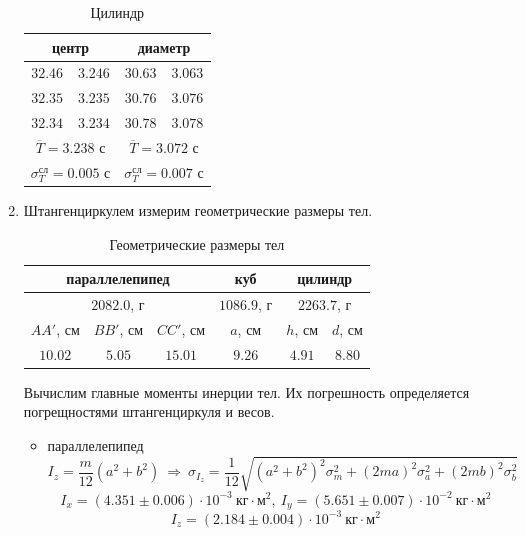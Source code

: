 \documentclass[a4paper,12pt]{article}
\begin{document}
\begin{enumerate}
    \begin{table}[!h]
        \centering
        \begin{tabular}{|c|c|c|c|} \hline
            \multicolumn{2}{|c}{центр} & \multicolumn{2}{|c}{диаметр} \\ \hline
            $32.46$ & $3.246$ & $30.63$ & $3.063$ \\ \hline
            $32.35$ & $3.235$ & $30.76$ & $3.076$ \\ \hline
            $32.34$ & $3.234$ & $30.78$ & $3.078$ \\ \hline
            \multicolumn{2}{|c|}{$\overline{T} = 3.238$ с} & \multicolumn{2}{|c|}{$\overline{T} = 3.072$ с} \\ 
            \multicolumn{2}{|c|}{$\sigma_T^{\text{сл}} = 0.005$ с} & \multicolumn{2}{|c|}{$\sigma_T^{\text{сл}} = 0.007$ с} \\ \hline
        \end{tabular}
        \caption{Цилиндр}
    \end{table}
    \item Штангенциркулем измерим геометрические размеры тел.
    \begin{table}[!h]
        \centering
        \begin{tabular}{|c|c|c|c|c|c|} \hline
            \multicolumn{3}{|c|}{параллелепипед} & куб & \multicolumn{2}{|c|}{цилиндр} \\ \hline
            \multicolumn{3}{|c|}{$2082.0$, г} & $1086.9$, г & \multicolumn{2}{|c|}{$2263.7$, г} \\ \hline
            $AA'$, см & $BB'$, см & $CC'$, см & $a$, см & $h$, см & $d$, см \\ \hline
            $10.02$ & $5.05$ & $15.01$ & $9.26$ & $4.91$ & $8.80$ \\ \hline
        \end{tabular}
        \caption{Геометрические размеры тел}
    \end{table}
    Вычислим главные моменты инерции тел. Их погрешность определяется погрещностями штангенциркуля и весов.
    \begin{itemize}
        \item параллелепипед
        $$
        I_z = \frac{m}{12}(a^2 + b^2)~\Rightarrow~\sigma_{I_z} = \frac{1}{12}\sqrt{\left(a^2+b^2\right)^2\sigma^2_m + (2ma)^2\sigma^2_a + (2mb)^2\sigma^2_b}
        $$
        $$
        I_x = (4.351\pm 0.006)\cdot 10^{-3}~\text{кг$\cdot$м$^2$},~I_y = (5.651\pm 0.007)\cdot 10^{-2}~\text{кг$\cdot$м$^2$}
        $$
        $$
        I_z = (2.184\pm 0.004)\cdot 10^{-3}~\text{кг$\cdot$м$^2$}
$$
\end{itemize}
\end{enumerate}
\end{document}
